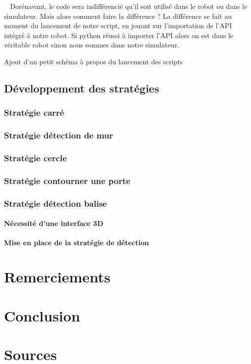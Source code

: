 \documentclass[12pt]{article}
\def\tab{$\>\>\>\>$}
\begin{document}
\tab Dorénavant, le code sera indifférencié qu'il soit utilisé dans le robot ou dans le simulateur. Mais alors comment faire la différence ? La différence se fait au moment du lancement de notre script, en jouant sur l'importation de l'API intégré à notre robot. Si python réussi à importer l'API alors on est dans le véritable robot sinon nous sommes dans notre simulateur.

\begin{center}
Ajout d'un petit schéma à propos du lancement des scripts
\end{center}

\newpage
\subsection{Développement des stratégies}
\subsubsection{Stratégie carré}
\subsubsection{Stratégie détection de mur}
\subsubsection{Stratégie cercle}
\subsubsection{Stratégie contourner une porte}
\subsubsection{Stratégie détection balise}
\paragraph{Nécessité d'une interface 3D \\}
\paragraph{Mise en place de la stratégie de détection\\}

\newpage

\section{Remerciements}

\newpage

\section{Conclusion}

\newpage

\section{Sources}
\end{document}
